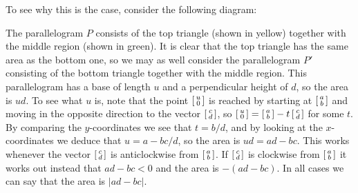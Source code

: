 \documentclass[reqno]{amsart}
\theoremstyle{definition}
\begin{document}
To see why this is the case, consider the following diagram:
\begin{center}
\end{center}
The parallelogram $P$ consists of the top triangle (shown in yellow)
together with the middle region (shown in green).  It is clear that
the top triangle has the same area as the bottom one, so we may as
well consider the parallelogram $P'$ consisting of the bottom triangle
together with the middle region.  This parallelogram has a base of
length $u$ and a perpendicular height of $d$, so the area is $ud$.  To
see what $u$ is, note that the point $\left[\begin{smallmatrix} u\\ 0\end{smallmatrix}\right]$ is reached by
starting at $\left[\begin{smallmatrix} a\\ b\end{smallmatrix}\right]$ and moving in the opposite direction to
the vector $\left[\begin{smallmatrix} c\\ d\end{smallmatrix}\right]$, so
$\left[\begin{smallmatrix} u\\ 0\end{smallmatrix}\right]=\left[\begin{smallmatrix} a\\ b\end{smallmatrix}\right]-t\left[\begin{smallmatrix} c\\ d\end{smallmatrix}\right]$ for some $t$.  By
comparing the $y$-coordinates we see that $t=b/d$, and by looking at
the $x$-coordinates we deduce that $u=a-bc/d$, so the area is
$ud=ad-bc$.  This works whenever the vector $\left[\begin{smallmatrix} c\\ d\end{smallmatrix}\right]$ is
anticlockwise from $\left[\begin{smallmatrix} a\\ b\end{smallmatrix}\right]$.  If $\left[\begin{smallmatrix} c\\ d\end{smallmatrix}\right]$ is clockwise
from $\left[\begin{smallmatrix} a\\ b\end{smallmatrix}\right]$ it works out instead that $ad-bc<0$ and the area
is $-(ad-bc)$.  In all cases we can say that the area is $|ad-bc|$.
\end{document}
